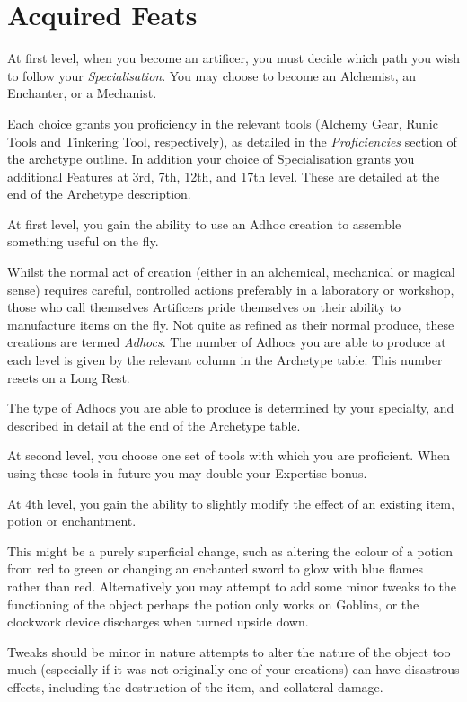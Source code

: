 \section*{Acquired Feats}

{
	At first level, when you become an artificer, you must decide which path you wish to follow \minus{} your {\it Specialisation}. You may choose to become an Alchemist, an Enchanter, or a Mechanist. 
	
	Each choice grants you proficiency in the relevant tools (Alchemy Gear, Runic Tools and Tinkering Tool, respectively), as detailed in the {\it Proficiencies} section of the archetype outline. In addition your choice of Specialisation grants you additional Features at 3rd, 7th, 12th, and 17th level. These are detailed at the end of the Archetype description. 
}

{
	At first level, you gain the ability to use an Ad\minus{}hoc creation to assemble something useful on the fly. 
	
	Whilst the normal act of creation (either in an alchemical, mechanical or magical sense) requires careful, controlled actions \minus{} preferably in a laboratory or workshop, those who call themselves Artificers pride themselves on their ability to manufacture items on the fly. Not quite as refined as their normal produce, these creations are termed {\it Ad\minus{}hocs}. The number of Ad\minus{}hocs you are able to produce at each level is given by the relevant column in the Archetype table. This number resets on a Long Rest. 
	
	The type of Ad\minus{}hocs you are able to produce is determined by your specialty, and described in detail at the end of the Archetype table. 	
}

{
	At second level, you choose one set of tools with which you are proficient. When using these tools in future you may double your Expertise bonus.  
}

{
	At 4th level, you gain the ability to slightly modify the effect of an existing item, potion or enchantment. 
	
	This might be a purely superficial change, such as altering the colour of a potion from red to green or changing an enchanted sword to glow with blue flames rather than red. Alternatively you may attempt to add some minor tweaks to the functioning of the object \minus{} perhaps the potion only works on Goblins, or the clockwork device discharges when turned upside down. 
	
	Tweaks should be minor in nature \minus{} attempts to alter the nature of the object too much (especially if it was not originally one of your creations) can have disastrous effects, including the destruction of the item, and collateral damage.  
}

